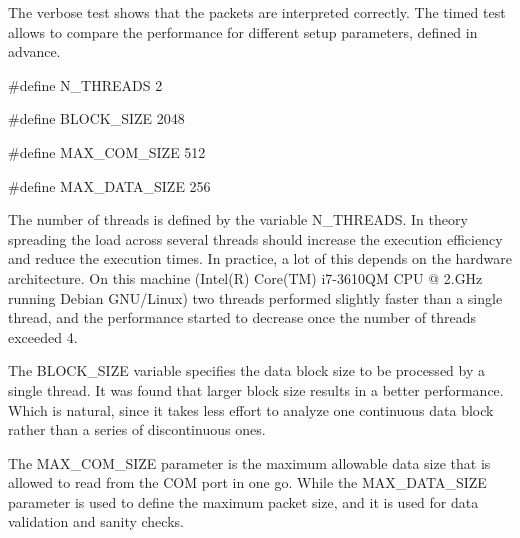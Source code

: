 The verbose test shows that the packets are interpreted correctly. The timed test allows to compare the performance for different setup parameters, defined in advance.


\begin{DoxyCodeInclude}

\textcolor{preprocessor}{#define N\_THREADS 2}

\textcolor{preprocessor}{#define BLOCK\_SIZE 2048}

\textcolor{preprocessor}{#define MAX\_COM\_SIZE 512}

\textcolor{preprocessor}{#define MAX\_DATA\_SIZE 256}
\end{DoxyCodeInclude}
 The number of threads is defined by the variable N\+\_\+\+T\+H\+R\+E\+A\+DS. In theory spreading the load across several threads should increase the execution efficiency and reduce the execution times. In practice, a lot of this depends on the hardware architecture. On this machine (Intel(\+R) Core(\+T\+M) i7-\/3610\+QM C\+PU @ 2.\+G\+Hz running Debian G\+N\+U/\+Linux) two threads performed slightly faster than a single thread, and the performance started to decrease once the number of threads exceeded 4.

The B\+L\+O\+C\+K\+\_\+\+S\+I\+ZE variable specifies the data block size to be processed by a single thread. It was found that larger block size results in a better performance. Which is natural, since it takes less effort to analyze one continuous data block rather than a series of discontinuous ones.

The M\+A\+X\+\_\+\+C\+O\+M\+\_\+\+S\+I\+ZE parameter is the maximum allowable data size that is allowed to read from the C\+OM port in one go. While the M\+A\+X\+\_\+\+D\+A\+T\+A\+\_\+\+S\+I\+ZE parameter is used to define the maximum packet size, and it is used for data validation and sanity checks. 